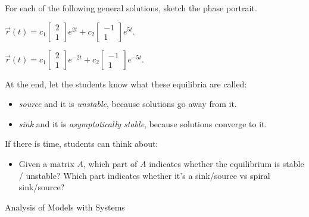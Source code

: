 \question
	For each of the following general solutions, sketch the phase portrait.
\begin{parts}
	\item $	\vec{r}(t) = c_1 \begin{bmatrix} 2 \\ 1 \end{bmatrix} e^{2t} + c_2 \begin{bmatrix} -1 \\ 1 \end{bmatrix} e^{5t}.$
	\item $	\vec{r}(t) = c_1 \begin{bmatrix} 2 \\ 1 \end{bmatrix} e^{-2t} + c_2 \begin{bmatrix} -1 \\ 1 \end{bmatrix} e^{-5t}.$	
\end{parts}
\begin{annotation}
	\begin{goals}
	At the end, let the students know what these equilibria are called:
	\begin{itemize}
		\item \emph{source} and it is \emph{unstable}, because solutions go away from it.
		\item \emph{sink} and it is \emph{asymptotically stable}, because solutions converge to it.
	\end{itemize}
	
	If there is time, students can think about:
	\begin{itemize}
		\item Given a matrix $A$, which part of $A$ indicates whether the equilibrium is stable / unstable? Which part indicates whether it's a sink/source vs spiral sink/source?
	\end{itemize}
	\end{goals}
\end{annotation}





\standardonlynewpage

%
%



\begin{module}{Analysis of Models with Systems}
	\label{sys:analysis}

	
	
\end{module}



